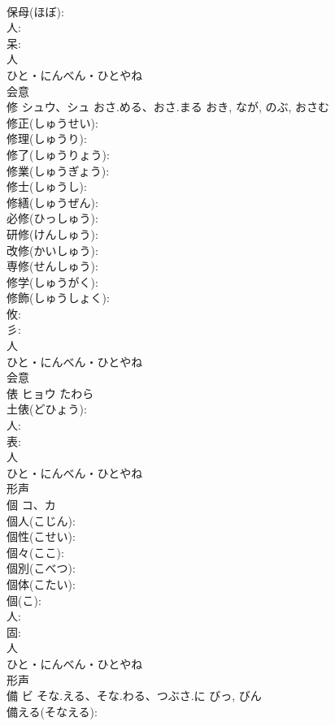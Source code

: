 \documentclass[8pt]{extreport}
\begin{document}
\begin{CJK}{UTF8}{min}
\\	保母(ほぼ): 
\\	人: 
\\	呆: 
\\	人	
\\	ひと・にんべん・ひとやね	
\\	会意 
\\	修	シュウ、シュ	おさ.める、おさ.まる	おき, なが, のぶ, おさむ	
\\	修正(しゅうせい): 
\\	修理(しゅうり): 
\\	修了(しゅうりょう): 
\\	修業(しゅうぎょう): 
\\	修士(しゅうし): 
\\	修繕(しゅうぜん): 
\\	必修(ひっしゅう): 
\\	研修(けんしゅう): 
\\	改修(かいしゅう): 
\\	専修(せんしゅう): 
\\	修学(しゅうがく): 
\\	修飾(しゅうしょく): 
\\	攸: 
\\	彡: 
\\	人	
\\	ひと・にんべん・ひとやね	
\\	会意 
\\	俵	ヒョウ	たわら		
\\	土俵(どひょう): 
\\	人: 
\\	表: 
\\	人	
\\	ひと・にんべん・ひとやね	
\\	形声 
\\	個	コ、カ			
\\	個人(こじん): 
\\	個性(こせい): 
\\	個々(ここ): 
\\	個別(こべつ): 
\\	個体(こたい): 
\\	個(こ): 
\\	人: 
\\	固: 
\\	人	
\\	ひと・にんべん・ひとやね	
\\	形声 
\\	備	ビ	そな.える、そな.わる、つぶさ.に	びっ, びん	
\\	備える(そなえる): 

\end{CJK}
\end{document}
